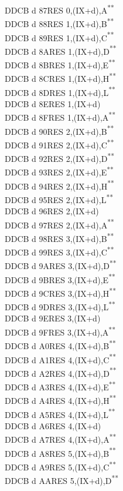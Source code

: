 \documentclass[twoside,openright,a4paper]{book}
\newcommand{\UNDOC}{\textnormal{\textsuperscript{**}}}
\begin{document}
\begin{multicols}{3}
{\begin{tabbing}
	DDCB d 87\>RES 0,(IX+d),A\UNDOC\\
	DDCB d 88\>RES 1,(IX+d),B\UNDOC\\
	DDCB d 89\>RES 1,(IX+d),C\UNDOC\\
	DDCB d 8A\>RES 1,(IX+d),D\UNDOC\\
	DDCB d 8B\>RES 1,(IX+d),E\UNDOC\\
	DDCB d 8C\>RES 1,(IX+d),H\UNDOC\\
	DDCB d 8D\>RES 1,(IX+d),L\UNDOC\\
	DDCB d 8E\>RES 1,(IX+d)\\
	DDCB d 8F\>RES 1,(IX+d),A\UNDOC\\
	DDCB d 90\>RES 2,(IX+d),B\UNDOC\\
	DDCB d 91\>RES 2,(IX+d),C\UNDOC\\
	DDCB d 92\>RES 2,(IX+d),D\UNDOC\\
	DDCB d 93\>RES 2,(IX+d),E\UNDOC\\
	DDCB d 94\>RES 2,(IX+d),H\UNDOC\\
	DDCB d 95\>RES 2,(IX+d),L\UNDOC\\
	DDCB d 96\>RES 2,(IX+d)\\
	DDCB d 97\>RES 2,(IX+d),A\UNDOC\\
	DDCB d 98\>RES 3,(IX+d),B\UNDOC\\
	DDCB d 99\>RES 3,(IX+d),C\UNDOC\\
	DDCB d 9A\>RES 3,(IX+d),D\UNDOC\\
	DDCB d 9B\>RES 3,(IX+d),E\UNDOC\\
	DDCB d 9C\>RES 3,(IX+d),H\UNDOC\\
	DDCB d 9D\>RES 3,(IX+d),L\UNDOC\\
	DDCB d 9E\>RES 3,(IX+d)\\
	DDCB d 9F\>RES 3,(IX+d),A\UNDOC\\
	DDCB d A0\>RES 4,(IX+d),B\UNDOC\\
	DDCB d A1\>RES 4,(IX+d),C\UNDOC\\
	DDCB d A2\>RES 4,(IX+d),D\UNDOC\\
	DDCB d A3\>RES 4,(IX+d),E\UNDOC\\
	DDCB d A4\>RES 4,(IX+d),H\UNDOC\\
	DDCB d A5\>RES 4,(IX+d),L\UNDOC\\
	DDCB d A6\>RES 4,(IX+d)\\
	DDCB d A7\>RES 4,(IX+d),A\UNDOC\\
	DDCB d A8\>RES 5,(IX+d),B\UNDOC\\
	DDCB d A9\>RES 5,(IX+d),C\UNDOC\\
	DDCB d AA\>RES 5,(IX+d),D\UNDOC\\

\end{tabbing}}
\end{multicols}
\end{document}
